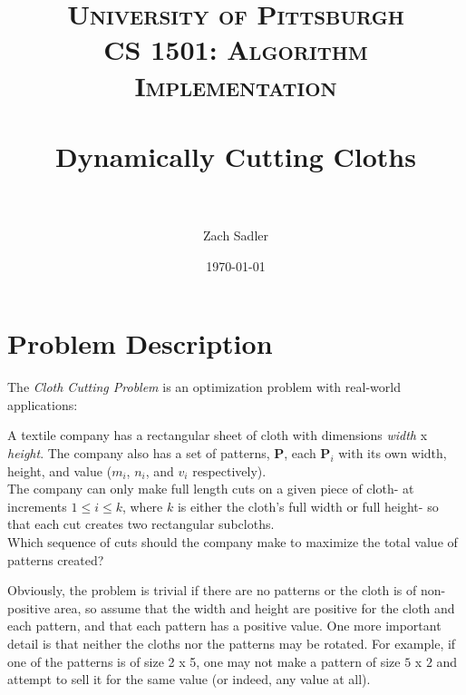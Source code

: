 \documentclass[paper=a4, fontsize=11pt]{scrartcl} %
\title{	
\normalfont \normalsize 
\textsc{University of Pittsburgh\\
CS 1501: Algorithm Implementation} \\ [25pt] %
\horrule{0.5pt} \\[0.4cm] %
\huge Dynamically Cutting Cloths\\ %
\horrule{2pt} \\[0.5cm] %
}
\author{Zach Sadler} %
\date{\normalsize\today} %
\numberwithin{equation}{section} %
\numberwithin{figure}{section} %
\numberwithin{table}{section} %
\newenvironment{myindentpar}[1]%
     {\begin{list}{}%
             {\setlength{\leftmargin}{#1}
              \setlength{\rightmargin}{#1}
              }%
             \item[]%
     }
     {\end{list}}
\begin{document}
\maketitle %


\section{Problem Description}

The \emph{Cloth Cutting Problem} is an optimization problem with real-world applications:
\begin{myindentpar}{1cm}
A textile company has a rectangular sheet of cloth with dimensions \emph{width} x \emph{height}. The company also has a set of patterns, $\mathbf{P}$, each $\mathbf{P}_i$ with its own width, height, and value ($m_i$, $n_i$, and \emph{$v_i$} respectively).\\
The company can only make full length cuts on a given piece of cloth- at increments $ 1 \le i \le k$, where $k$ is either the cloth's full width or full height- so that each cut creates two rectangular subcloths.\\
Which sequence of cuts should the company make to maximize the total value of patterns created?
\end{myindentpar}
%
Obviously, the problem is trivial if there are no patterns or the cloth is of non-positive area, so assume that the width and height are positive for the cloth and each pattern, and that each pattern has a positive value. One more important detail is that neither the cloths nor the patterns may be rotated. For example, if one of the patterns is of size 2 x 5, one may not make a pattern of size $5$ x $2$ and attempt to sell it for the same value (or indeed, any value at all).

\end{document}
